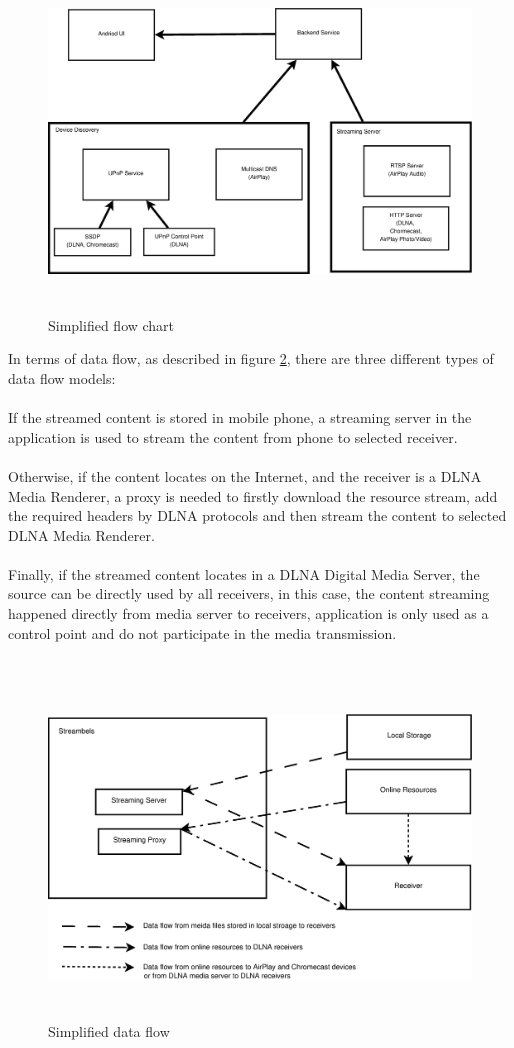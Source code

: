 \begin{figure}[htb]
\centering \includegraphics[height=9cm]{charts/chart3}
\caption{Simplified flow chart \label{chart3}}
\end{figure}

In terms of data flow, as described in figure \ref{chart4}, there are three
different types of data flow models:\\
\\ 
If the streamed content is stored in mobile phone, a streaming server in the
application is used to stream the content from phone to selected receiver.\\
\\
Otherwise, if the content locates on the Internet, and the receiver is a DLNA
Media Renderer, a proxy is needed to firstly download the resource stream, add
the required headers by DLNA protocols and then stream the content to selected
DLNA Media Renderer.\\
\\
Finally, if the streamed content locates in a DLNA Digital Media Server, the
source can be directly used by all receivers, in this case, the content
streaming happened directly from media server to receivers, application is only
used as a control point and do not participate in the media transmission.\\
\\
\begin{figure}[htb]
\centering \includegraphics[height=9cm]{charts/data_flow}
\caption{Simplified data flow \label{chart4}}
\end{figure}

